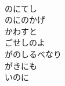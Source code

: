 \documentclass[10pt,b5j]{tarticle} %
\begin{document}
\begin{enumerate}
\begin{minipage}[c]{\blocksize}
    \end{minipage}
    \begin{minipage}[c]{\blocksize}
        
        \vspace{\linespace}
        \item~\\
        のにてし\\
        のにのかげ\\
        かわすと\\
        ごせしのよ\\
        がのしるべなり\\
        がきにも\\
        いのに
    
    \end{minipage}
\end{enumerate} %
\end{document}
